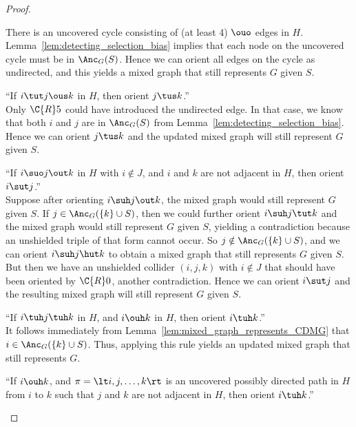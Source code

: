 \begin{proof}
\begin{description}
      There is an uncovered cycle consisting of (at least 4) $\ouo$ edges in $H$. 
      Lemma~\ref{lem:detecting_selection_bias} implies that each node on the uncovered cycle must be in $\Anc_G(S)$.
      Hence we can orient all edges on the cycle as undirected, and this yields a mixed graph that still represents $G$ given $S$.
    \item[$\C{R}6$] ``If $i \tut j \ous k$ in $H$, then orient $j \tus k$.''\\
      Only $\C{R}5$ could have introduced the undirected edge.
      In that case, we know that both $i$ and $j$ are in $\Anc_G(S)$ from Lemma~\ref{lem:detecting_selection_bias}. 
      Hence we can orient $j \tus k$ and the updated mixed graph will still represent $G$ given $S$.
    \item[$\C{R}7$] ``If $i \suo j \out k$ in $H$ with $i \notin J$, and $i$ and $k$ are not adjacent in $H$, then orient $i \sut j$.''\\
      Suppose after orienting $i \suh j \out k$, the mixed graph would still represent $G$ given $S$.
      If $j \in \Anc_G(\{k\} \cup S)$, then we could further orient $i \suh j \tut k$ and the mixed graph would still represent $G$ given $S$, yielding a contradiction because
      an unshielded triple of that form cannot occur. 
      So $j \notin \Anc_G(\{k\} \cup S)$, and we can orient $i \suh j \hut k$ to obtain a mixed graph that still represents $G$ given $S$.
      But then we have an unshielded collider $(i,j,k)$ with $i \notin J$ that should have been oriented by $\C{R}0$, another contradiction.
      Hence we can orient $i \sut j$ and the resulting mixed graph will still represent $G$ given $S$.
    \item[$\C{R}8$] ``If $i \tuh j \tuh k$ in $H$, and $i \ouh k$ in $H$, then orient $i \tuh k$.''\\
      It follows immediately from Lemma~\ref{lem:mixed_graph_represents_CDMG} that $i \in \Anc_G(\{k\} \cup S)$.
      Thus, applying this rule yields an updated mixed graph that still represents $G$.
    \item[$\C{R}9$] ``If $i \ouh k$, and $\pi = \lt i, j, \dots, k \rt$ is an uncovered possibly directed path in $H$ from $i$ to $k$ such that $j$ and $k$ are not adjacent in $H$, then orient $i \tuh k$.''\\

\end{description}
\end{proof}
